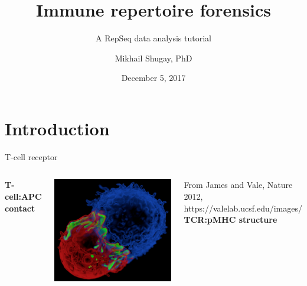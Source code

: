 \documentclass[12pt]{beamer}
\author{Mikhail Shugay, PhD}
\title{Immune repertoire forensics}
\subtitle{A RepSeq data analysis tutorial}
\institute[Skoltech]{\texttt {Skoltech, MA03172 course [Term 2, 2017-2018]}}
\date{December 5, 2017}
\begin{document}
\maketitle

\section{Introduction}
\begin{frame}{T-cell receptor}
\begin{columns}
\textbf{T-cell:APC contact}\\~\

\includegraphics[scale=0.13]{p1}\\~\

From James and Vale, Nature 2012, https://valelab.ucsf.edu/images/
\pause
{}
\textbf{TCR:pMHC structure}\\~\


\end{columns}
\end{frame}
\end{document}
